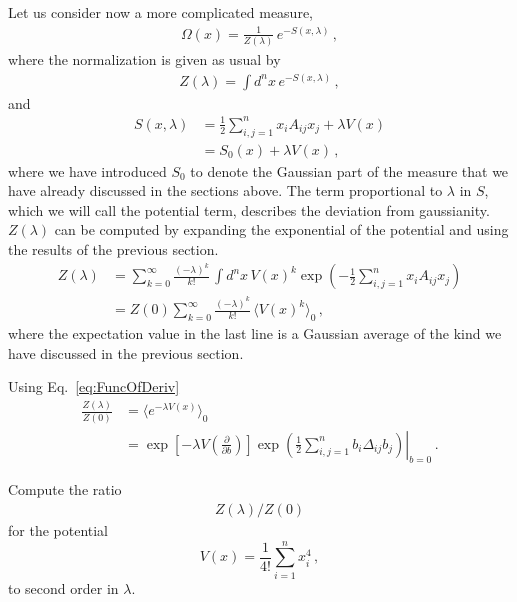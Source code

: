 Let us consider now a more complicated measure, 
\begin{align}
  \label{eq:PertGaussMeas}
  \Omega(x) = \frac{1}{Z(\lambda)}\, e^{-S(x,\lambda)}\, ,
\end{align}
where the normalization is given as usual by
\begin{align}
  \label{eq:PertGaussNorm}
  Z(\lambda) = \int d^nx\, e^{-S(x,\lambda)}\, ,
\end{align}
and 
\begin{align}
  \label{eq:PertGaussAction}
  S(x,\lambda) &= \frac12 \sum_{i,j=1}^n x_i A_{ij} x_j + 
  \lambda V(x) \\
  &= S_0(x) + \lambda V(x)\, ,
\end{align}
where we have introduced $S_0$ to denote the Gaussian part of the
measure that we have already discussed in the sections above.  The
term proportional to $\lambda$ in $S$, which we will call the
potential term, describes the deviation from gaussianity.
$Z(\lambda)$ can be computed by expanding the exponential of the
potential and using the results of the previous section.
\begin{align}
  Z(\lambda) &= \sum_{k=0}^\infty \frac{(-\lambda)^k}{k!}\, 
               \int d^nx\, V(x)^k  \exp\left(
    -\frac12 \sum_{i,j=1}^n x_i A_{ij} x_j
    \right) \\
  &= Z(0) \sum_{k=0}^\infty \frac{(-\lambda)^k}{k!}\,
    \langle V(x)^k\rangle_0\, ,
\end{align}
where the expectation value in the last line is a Gaussian average of the kind we have discussed in the previous section. 

Using Eq.~\ref{eq:FuncOfDeriv} 
\begin{align}
  \frac{Z(\lambda)}{Z(0)} &= \langle e^{-\lambda V(x)} \rangle_0 \\
  &= \exp\left[-\lambda V\left(\frac{\partial}{\partial b}\right)\right]
    \left. \exp\left(
    \frac12 \sum_{i,j=1}^n b_i \Delta_{ij} b_j
  \right) \right|_{b=0}\, .
\end{align}

\begin{Ex}
  Compute the ratio 
\begin{align}
  Z(\lambda)/Z(0)
\end{align}
for the potential 
\begin{equation}
  \label{eq:QuarticPot}
  V(x) = \frac{1}{4!} \sum_{i=1}^n x_i^4\, ,
\end{equation}
to second order in $\lambda$.

\end{Ex}

